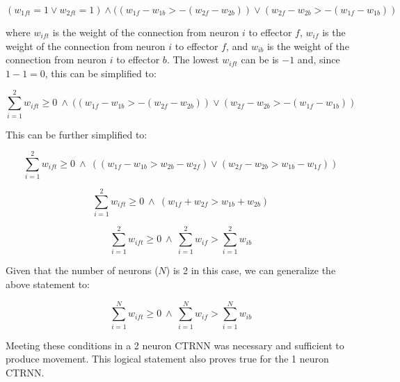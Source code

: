 \documentclass{article}
\begin{document}
\begin{equation}
(w_{1ft} = 1 \vee w_{2ft} = 1)  \wedge ((w_{1f} - w_{1b} > -(w_{2f} - w_{2b})) \vee (w_{2f} - w_{2b} > -(w_{1f} - w_{1b}) )
\end{equation}

where \(w_{ift}\) is the weight of the connection from neuron \(i\) to effector \(f\), \(w_{if}\) is the weight of the connection from neuron \(i\) to effector \(f\), and \(w_{ib}\) is the weight of the connection from neuron \(i\) to effector \(b\). The lowest $w_{ift}$ can be is $-1$ and, since \(1-1=0\), this can be simplified to:

\[\sum_{i=1}^{2} w_{ift} \geq 0 \ \wedge \ ((w_{1f} - w_{1b} > -(w_{2f} - w_{2b})) \vee (w_{2f} - w_{2b} > -(w_{1f} - w_{1b}) )\]

This can be further simplified to:

\[\sum_{i=1}^{2} w_{ift} \geq 0 \ \wedge \ ((w_{1f} - w_{1b} > w_{2b}- w_{2f}) \vee (w_{2f} - w_{2b} > w_{1b} - w_{1f}) )\]

\[\sum_{i=1}^{2} w_{ift} \geq 0 \ \wedge \ (w_{1f} + w_{2f} > w_{1b} + w_{2b}) \]

\[\sum_{i=1}^{2} w_{ift} \geq 0 \ \wedge \ \sum_{i=1}^{2} w_{if} > \sum_{i=1}^{2} w_{ib} \]

Given that the number of neurons ($N$) is 2 in this case, we can generalize the above statement to:

\begin{equation}
  \sum_{i=1}^{N} w_{ift} \geq 0 \ \wedge \ \sum_{i=1}^{N} w_{if} > \sum_{i=1}^{N} w_{ib}
\end{equation}

Meeting these conditions in a 2 neuron CTRNN was necessary and sufficient to produce movement. This logical statement also proves true for the 1 neuron CTRNN.
\end{document}
